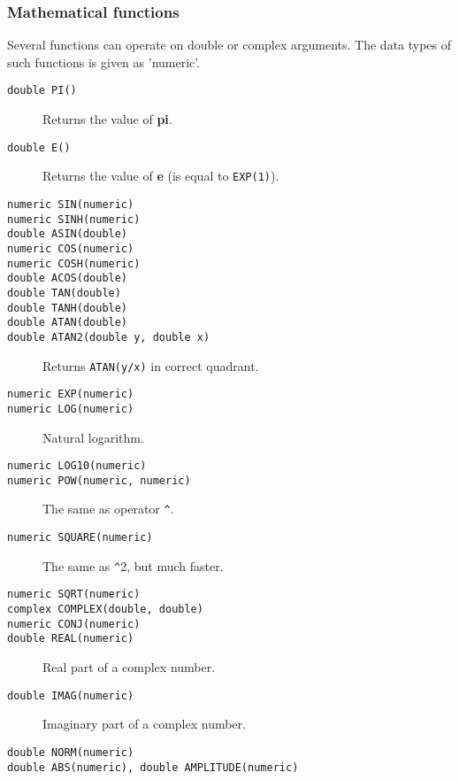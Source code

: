 \subsubsection{Mathematical functions}
Several functions can operate on double or complex arguments.
The data types of such functions is given as 'numeric'.
\begin{description}
  \item[ \texttt{double PI()}] Returns the value of \textbf{pi}.
  \item[ \texttt{double E()}] Returns the value of \textbf{e} (is equal to \texttt{EXP(1)}).
  \item[ \texttt{numeric SIN(numeric)}]
  \item[ \texttt{numeric SINH(numeric)}]
  \item[ \texttt{double ASIN(double)}]
  \item[ \texttt{numeric COS(numeric)}]
  \item[ \texttt{numeric COSH(numeric)}]
  \item[ \texttt{double ACOS(double)}]
  \item[ \texttt{double TAN(double)}]
  \item[ \texttt{double TANH(double)}]
  \item[ \texttt{double ATAN(double)}]
  \item[ \texttt{double ATAN2(double y, double x)}]
       Returns \texttt{ATAN(y/x)} in correct quadrant.
  \item[ \texttt{numeric EXP(numeric)}]
  \item[ \texttt{numeric LOG(numeric)}] Natural logarithm.
  \item[ \texttt{numeric LOG10(numeric)}]
  \item[ \texttt{numeric POW(numeric, numeric)}] The same as operator \verb+^+.
  \item[ \texttt{numeric SQUARE(numeric)}] The same as \verb+^+2, but much faster.
  \item[ \texttt{numeric SQRT(numeric)}]
  \item[ \texttt{complex COMPLEX(double, double)}]
  \item[ \texttt{numeric CONJ(numeric)}]
  \item[ \texttt{double REAL(numeric)}] Real part of a complex number.
  \item[ \texttt{double IMAG(numeric)}] Imaginary part of a complex number.
  \item[ \texttt{double NORM(numeric)}]
  \item[ \texttt{double ABS(numeric),  double AMPLITUDE(numeric)}]

\end{description}

